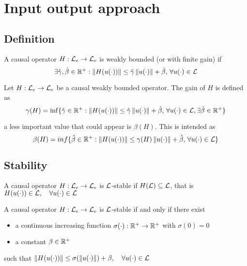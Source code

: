 \chapter{Input output approach}

\section{Definition}

\begin{definition}
	A causal operator $H : \mathcal{L}_e \to \mathcal{L}_e$ is weakly bounded (or with finite gain) if
	\[
		\exists \hat\gamma, \hat\beta \in \mathbb{R}^+ : \left\lVert H(u(\cdot))\right\rVert \leq \hat\gamma \left\lVert u(\cdot)\right\rVert + \hat\beta, \, \forall u(\cdot) \in \mathcal{L}
	\]
\end{definition}

\begin{definition}
	Let $H : \mathcal{L}_e \to \mathcal{L}_e$ be a causal weakly bounded operator.
	The gain of $H$ is defined as
	\[
		\gamma(H) = \inf\{\hat\gamma \in \mathbb{R}^+ : \left\lVert H(u(\cdot))\right\rVert \leq \hat\gamma \left\lVert u(\cdot)\right\rVert + \hat\beta, \, \forall u(\cdot) \in \mathcal{L}, \exists \hat\beta \in \mathbb{R}^+\}
	\]
\end{definition}

\begin{nb}a less important value that could appear is $\beta(H)$.
This is intended as
\[
	\beta(H) = inf\{\hat\beta \in \mathbb{R}^+ : \left\lVert H(u(\cdot))\right\rVert \leq \gamma(H) \left\lVert u(\cdot)\right\rVert + \hat\beta, \, \forall u(\cdot) \in \mathcal{L}\}
\]
\end{nb}

\section{Stability}

\begin{definition}
	A causal operator $H : \mathcal{L}_e \to \mathcal{L}_e$ is $\mathcal{L}$-stable if $H(\mathcal{L}) \subseteq \mathcal{L}$, that is $H(u(\cdot)) \in \mathcal{L}, \quad \forall u(\cdot) \in \mathcal{L}$
\end{definition}

\begin{theorem}
	A causal operator $H : \mathcal{L}_e \to \mathcal{L}_e$ is $\mathcal{L}$-stable if and only if there exist
	\begin{itemize}
		\item a continuous increasing function $\sigma(\cdot): \mathbb{R}^+ \to \mathbb{R}^+$ with $\sigma(0) = 0$
		\item a constant $\beta \in \mathbb{R}^+$
	\end{itemize}
	such that $\left\lVert H(u(\cdot))\right\rVert \leq \sigma(\left\lVert u(\cdot)\right\rVert) + \beta, \quad \forall u(\cdot) \in \mathcal{L}$
\end{theorem}

